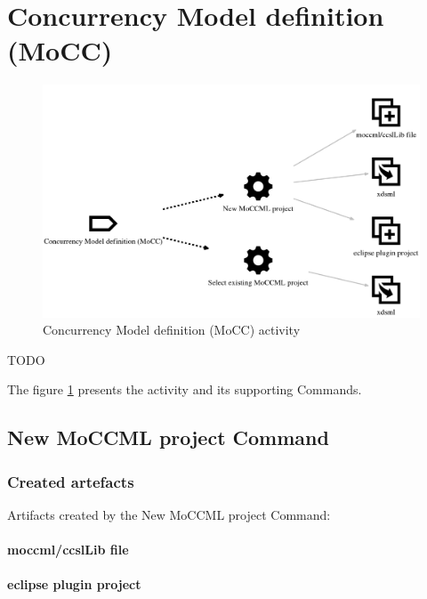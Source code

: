 \documentclass{gemoc} %
\begin{document}
\section{Concurrency Model definition (MoCC)}
\label{sec:Concurrency_Model_definition__MoCC_}
\begin{figure}[h!]
		\center
		\includegraphics*[trim=0.0cm 0.0cm 0cm 0.0cm, clip=true]{fig/Concurrency_Model_definition__MoCC_}
		\caption{Concurrency Model definition (MoCC) activity}
		\label{fig:Concurrency_Model_definition__MoCC_}
\end{figure}

TODO

The figure \ref{fig:Concurrency_Model_definition__MoCC_} presents the activity and its supporting Commands.

\subsection{New MoCCML project Command}

\subsubsection{Created artefacts}
Artifacts created by the New MoCCML project Command:
\paragraph{moccml/ccslLib file} 
\paragraph{eclipse plugin project} 
\end{document}
